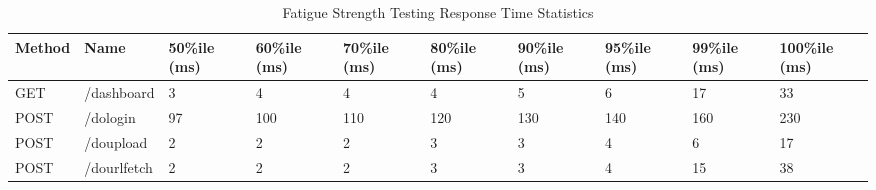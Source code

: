 \begin{table*}[h]
  \caption{Fatigue Strength Testing Response Time Statistics}
  \label{tab:fstrespstat}
  \begin{tabular}{|p{}|p{}|p{}|p{}|p{}|p{}|p{}|p{}|p{}|p{}|}
    \hline
    {\textbf{Method}} &  {\textbf{Name}} &  {\textbf{50\%ile (ms)}} &  {\textbf{60\%ile (ms)}} &  {\textbf{70\%ile (ms)}} &  {\textbf{80\%ile (ms)}} &  {\textbf{90\%ile (ms)}} &  {\textbf{95\%ile (ms)}} &  {\textbf{99\%ile (ms)}} &  {\textbf{100\%ile (ms)}} \\ \hline
    GET                                   & /dashboard                         & 3                                          & 4                                          & 4                                          & 4                                          & 5                                          & 6                                          & 17                                         & 33                                          \\ \hline
    POST                                  & /dologin                           & 97                                         & 100                                        & 110                                        & 120                                        & 130                                        & 140                                        & 160                                        & 230                                         \\ \hline
    POST                                  & /doupload                          & 2                                          & 2                                          & 2                                          & 3                                          & 3                                          & 4                                          & 6                                          & 17                                          \\ \hline
    POST                                  & /dourlfetch                        & 2                                          & 2                                          & 2                                          & 3                                          & 3                                          & 4                                          & 15                                         & 38                                          \\ \hline

\end{tabular}
\end{table*}
